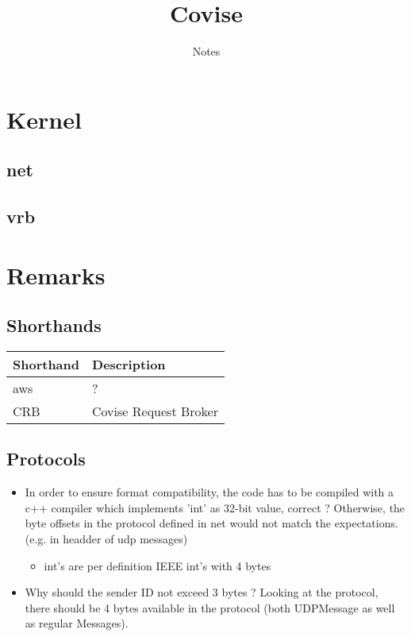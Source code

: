 \documentclass[12pt,pdftex,a4paper]{scrbook}
\newcommand{\shandentry}[2]{\label{intern::shorthands::#1} #1 & #2 \\ \hline}
\begin{document}
	\thispagestyle{empty}
	\title{Covise}
	\subtitle{Notes}
	\author{}
	\maketitle
	
	\newpage
	\tableofcontents

	\part{Kernel}
	
	\chapter{net}
	
	
	
	\chapter{vrb}

	\part{Remarks}

	\chapter{Shorthands}
	
	\begin{tabular}{||p{4cm}|p{10cm}||}
		\hline
		\textbf{Shorthand} & \textbf{Description}\\
		\hline
		\hline
		\shandentry{aws}{?}
		\shandentry{CRB}{Covise Request Broker}
	\end{tabular}

	\chapter{Protocols}

	\begin{itemize}
		\item In order to ensure format compatibility, the code has to be compiled with a c++ compiler which implements 'int' as 32-bit value, correct ? Otherwise, the byte offsets in the protocol defined in net would not match the expectations. (e.g. in headder of udp messages)
		\begin{itemize}
			\item int's are per definition IEEE int's with 4 bytes
		\end{itemize}
		\item Why should the sender ID not exceed 3 bytes ? Looking at the protocol, there should be 4 bytes available in the protocol (both UDPMessage as well as regular Messages). 
	\end{itemize}
\end{document}
